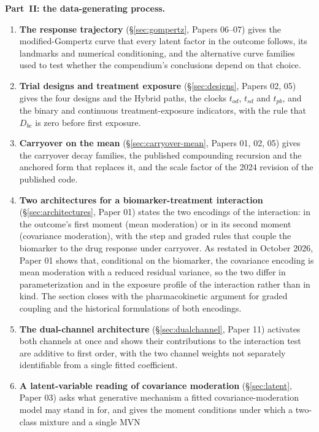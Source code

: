 \documentclass[11pt]{article}
\begin{document}
\noindent\textbf{Part~II: the data-generating process.}
\begin{enumerate}[label=\textbf{\arabic*.}, itemsep=2pt, resume]
\item \textbf{The response trajectory} (\S\ref{sec:gompertz}, Papers
  06--07) gives the modified-Gompertz curve that every latent factor
  in the outcome follows, its landmarks and numerical conditioning,
  and the alternative curve families used to test whether the
  compendium's conclusions depend on that choice.
\item \textbf{Trial designs and treatment exposure}
  (\S\ref{sec:designs}, Papers 02, 05) gives the four designs and the
  Hybrid paths, the clocks $t_{od}$, $t_{sd}$ and $t_{pb}$, and the
  binary and continuous treatment-exposure indicators, with the rule
  that $D_{bc}$ is zero before first exposure.
\item \textbf{Carryover on the mean} (\S\ref{sec:carryover-mean},
  Papers 01, 02, 05) gives the carryover decay families, the published
  compounding recursion and the anchored form that replaces it, and the
  scale factor of the 2024 revision of the published code.
\item \textbf{Two architectures for a biomarker-treatment interaction}
  (\S\ref{sec:architectures}, Paper 01) states the two encodings of
  the interaction: in the outcome's first moment (mean moderation) or
  in its second moment (covariance moderation), with the step and
  graded rules that couple the biomarker to the drug response under
  carryover. As restated in October 2026, Paper 01 shows that,
  conditional on the biomarker, the covariance encoding is mean
  moderation with a reduced residual variance, so the two differ in
  parameterization and in the exposure profile of the interaction
  rather than in kind. The section closes with the pharmacokinetic
  argument for graded coupling and the historical formulations of both
  encodings.
\item \textbf{The dual-channel architecture}
  (\S\ref{sec:dualchannel}, Paper 11) activates both channels at once
  and shows their contributions to the interaction test are additive
  to first order, with the two channel weights not separately
  identifiable from a single fitted coefficient.
\item \textbf{A latent-variable reading of covariance moderation}
  (\S\ref{sec:latent}, Paper 03) asks what generative mechanism a
  fitted covariance-moderation model may stand in for, and gives the
  moment conditions under which a two-class mixture and a single MVN

\end{enumerate}
\end{document}
